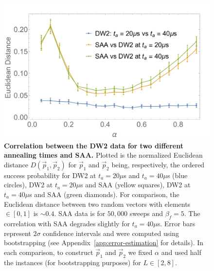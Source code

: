 \begin{figure}[t]
\begin{center}
\includegraphics[width=\columnwidth]{chapters/Planted/Euclidean-dist-DW20_vs_DW40_and_DW20-40_vs_SAA.pdf}
\caption{\textbf{Correlation between the DW2 data for two different annealing times and SAA.} Plotted is the normalized Euclidean distance $D(\vec{p}_1,\vec{p}_2)$ for $\vec{p}_1$ and $\vec{p}_2$ being, respectively, the ordered success probability
for DW2 at $t_a=20\mu$s and $t_a=40\mu$s (blue circles), DW2 at $t_a=20\mu$s and SAA (yellow squares), DW2 at $t_a=40\mu$s and SAA (green diamonds).  For comparison, the Euclidean distance between two random vectors with elements $\in [0,1]$  is $\sim 0.4$. SAA data is for $50,\!000$ sweeps and $\beta_f=5$.
The correlation with SAA degrades slightly for $t_a=40\mu$s. Error bars represent $2\sigma$ confidence intervals and were computed using bootstrapping (see Appendix~\ref{app:error-estimation} for details). In each comparison, to construct $\vec{p}_1$ and $\vec{p}_2$ we fixed $\alpha$ and used half the instances (for bootstrapping purposes) for $L\in[2,8]$.
}
\label{fig:Euclid-dist}
\end{center}
\end{figure}

